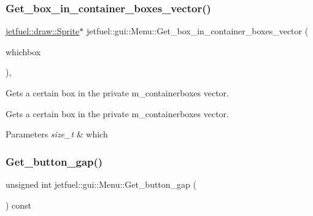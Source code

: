 \mbox{\label{classjetfuel_1_1gui_1_1Menu_a9f4a74b0103a6912e9236d1a66068aca}} 
\subsubsection{\texorpdfstring{Get\+\_\+box\+\_\+in\+\_\+container\+\_\+boxes\+\_\+vector()}{Get\_box\_in\_container\_boxes\_vector()}}
{\footnotesize\ttfamily \hyperlink{classjetfuel_1_1draw_1_1Sprite}{jetfuel\+::draw\+::\+Sprite}$\ast$ jetfuel\+::gui\+::\+Menu\+::\+Get\+\_\+box\+\_\+in\+\_\+container\+\_\+boxes\+\_\+vector (\begin{DoxyParamCaption}\item[{const size\+\_\+t}]{whichbox }\end{DoxyParamCaption})\hspace{0.3cm}{\ttfamily [inline]}, {\ttfamily [protected]}}



Gets a certain box in the private m\+\_\+containerboxes vector. 

Gets a certain box in the private m\+\_\+containerboxes vector.


\begin{DoxyParams}{Parameters}
{\em size\+\_\+t} & which \\
\hline
\end{DoxyParams}
\mbox{\label{classjetfuel_1_1gui_1_1Menu_a6ce40fbb47e1d6f6602092a4f4520bee}} 
\subsubsection{\texorpdfstring{Get\+\_\+button\+\_\+gap()}{Get\_button\_gap()}}
{\footnotesize\ttfamily unsigned int jetfuel\+::gui\+::\+Menu\+::\+Get\+\_\+button\+\_\+gap (\begin{DoxyParamCaption}{ }\end{DoxyParamCaption}) const\hspace{0.3cm}{\ttfamily [inline]}}




